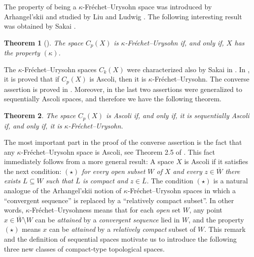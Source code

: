 \documentclass[preprint,11pt]{elsarticle}
\newtheorem{theorem}{Theorem}[section]
\numberwithin{equation}{section}
\numberwithin{theorem}{section}
\newcommand{\CC}{C_k}
\newcommand{\SM}{{\setminus}}
\begin{document}
The property of being a $\kappa$-Fr\'{e}chet--Urysohn space was introduced by Arhangel'skii and studied by Liu and Ludwig \cite{LiL}. The following interesting result was obtained by Sakai \cite{Sak2}.
\begin{theorem}[\cite{Sak2}] \label{t:Cp-kappa-FU}
The space $C_p(X)$ is $\kappa$-Fr\'{e}chet--Urysohn if, and only if, $X$ has the property $(\kappa)$.
\end{theorem}
The $\kappa$-Fr\'{e}chet--Urysohn  spaces $\CC(X)$ were characterized also by Sakai in \cite{Sakai-3}. In \cite{GGKZ}, it is proved that if $C_p(X)$ is Ascoli, then it is $\kappa$-Fr\'{e}chet--Urysohn. The converse assertion is proved in \cite{Gabr-B1}. Moreover, in \cite{Gabr-seq-Ascoli} the last two assertions were generalized to sequentially Ascoli spaces, and therefore we have the following theorem.

\begin{theorem} \label{t:Cp-Ascoli}
The space $C_p(X)$ is Ascoli if, and only if, it is sequentially Ascoli if, and only if, it is $\kappa$-Fr\'{e}chet--Urysohn. %
\end{theorem}

The most important part in the proof of the converse assertion is the fact that any  $\kappa$-Fr\'{e}chet--Urysohn space is Ascoli, see Theorem 2.5 of \cite{Gabr-B1}. This fact immediately follows from a more general result:  A space $X$ is Ascoli if it satisfies the next condition: {\em $(\star)$ for every open subset $W$ of $X$ and every $z\in \overline{W}$ there exists $L\subseteq W$ such that $\overline{L}$ is compact and $z\in \overline{L}$.}
The condition $(\star)$ is a natural  analogue of the Arhangel'skii notion of $\kappa$-Fr\'{e}chet--Urysohn spaces in which a ``convergent sequence'' is replaced by a ``relatively compact subset''. In other words, $\kappa$-Fr\'{e}chet--Urysohness means that for each {\em open} set $W$, any  point $x\in \overline{W}\SM W$  can be {\em attained} by a {\em convergent sequence} lied in $W$, and the property $(\star)$ means $x$ can be {\em attained} by a {\em relatively compact} subset of $W$. This remark and the definition of sequential spaces motivate us to introduce the following three new classes of compact-type topological spaces.
\end{document}
